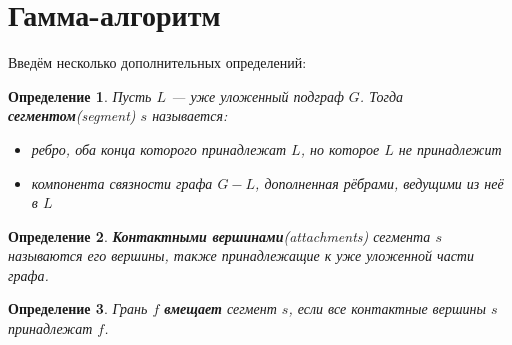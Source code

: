 \documentclass[a4paper, 10pt]{article}
\newtheorem{mydefinition}{Определение}
\begin{document}
\section{Гамма-алгоритм}

Введём несколько дополнительных определений:

\begin{mydefinition}
Пусть $L$ — уже уложенный подграф $G$. Тогда {\bf сегментом}({\it segment}) $s$ называется:
\begin{itemize}
\item ребро, оба конца которого принадлежат $L$, но которое $L$ не принадлежит
\item компонента связности графа $G - L$, дополненная рёбрами, ведущими из неё в $L$
\end{itemize}
\end{mydefinition}

\begin{mydefinition}
{\bf Контактными вершинами}({\it attachments}) сегмента $s$ называются его вершины, также принадлежащие к уже уложенной части графа.
\end{mydefinition}

\begin{mydefinition}
Грань $f$ {\bf вмещает} сегмент $s$, если все контактные вершины $s$ принадлежат $f$.
\end{mydefinition}
\end{document}
